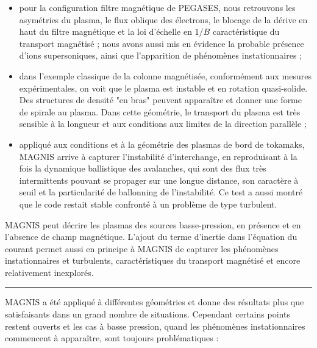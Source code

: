 \begin{itemize}
  \item pour la configuration filtre magnétique de PEGASES, nous retrouvons les
  asymétries du plasma, le flux oblique des électrons, le blocage de la dérive
  en haut du filtre magnétique et la loi d'échelle en $1/B$ caractéristique du
  transport magnétisé ; nous avons aussi mis en évidence la probable présence d'ions
  supersoniques, ainsi que l'apparition de phénomènes instationnaires ;
  \item dans l'exemple classique de la colonne magnétisée, conformément
  aux mesures expérimentales, on voit que le
  plasma est instable et en rotation quasi-solide. Des structures de
  densité "en bras" peuvent apparaître et donner une forme de spirale au
  plasma. Dans cette géométrie, le transport du plasma est très sensible à la
  longueur et aux conditions aux limites de la direction parallèle ;
  \item appliqué aux conditions et à la géométrie des plasmas de bord de
  tokamaks, MAGNIS arrive à capturer l'instabilité d'interchange,
  en reproduisant à la fois la dynamique ballistique des avalanches, qui sont
  des flux très intermittents pouvant se propager sur une longue distance, son
  caractère à seuil et la particularité de ballonning de l'instabilité.
  Ce test a aussi montré que le code restait stable confronté à un problème
  de type turbulent.
\end{itemize} 

MAGNIS peut décrire les plasmas des sources basse-pression, en présence et en
l'absence de champ magnétique. L'ajout du terme d'inertie dans l'équation du
courant permet aussi en principe à MAGNIS de capturer les phénomènes
instationnaires et turbulents, caractéristiques du transport magnétisé et encore relativement
inexplorés.

\begin{center}
\rule{0.6\textwidth}{1pt}
\end{center}

MAGNIS a été appliqué à différentes géométries et donne des résultats plus que
satisfaisants dans un grand nombre de situations. Cependant certains points
restent ouverts et les cas à basse pression, quand les phénomènes instationnaires
commencent à apparaître, sont toujours problématiques :

